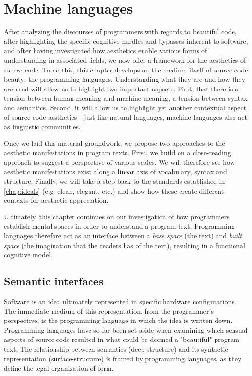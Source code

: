 \chapter{Machine languages}
\label{chap:programming}

After analyzing the discourses of programmers with regards to beautiful code, after highlighting the specific cognitive hurdles and bypasses inherent to software, and after having investigated how aesthetics enable various forms of understanding in associated fields, we now offer a framework for the aesthetics of source code. To do this, this chapter develops on the medium itself of source code beauty: the programming languages. Understanding what they are and how they are used will allow us to highlight two important aspects. First, that there is a tension between human-meaning and machine-meaning, a tension between syntax and semantics. Second, it will allow us to highlight yet another contextual aspect of source code aesthetics—just like natural languages, machine languages also act as linguistic communities.

Once we laid this material groundwork, we propose two approaches to the aesthetic manifestations in program texts. First, we build on a close-reading approach to suggest a perspective of various scales. We will therefore see how aesthetic manifestations exist along a linear axis of vocabulary, syntax and structure. Finally, we will take a step back to the standards established in \ref{chap:ideals} (e.g. clean, elegant, etc.) and show how these create different contexts for aesthetic appreciation.

Ultimately, this chapter continues on our investigation of how programmers establish mental spaces in order to understand a program text. Programming languages therefore act as an interface between a \emph{base space} (the text) and \emph{built space} (the imagination that the readers has of the text), resulting in a functional cognitive model.

\section{Semantic interfaces}
\label{sec:semantic-interfaces}

Software is an idea ultimately represented in specific hardware configurations. The immediate medium of this representation, from the programmer's perspective, is the programming language in which the idea is written down. Programming languages have so far been set aside when examining which sensual aspects of source code resulted in what could be deemed a "beautiful" program text. The relationship between semantics (deep-structure)  and its syntactic representation (surface-structure) is framed by programming languages, as they define the legal organization of form.


